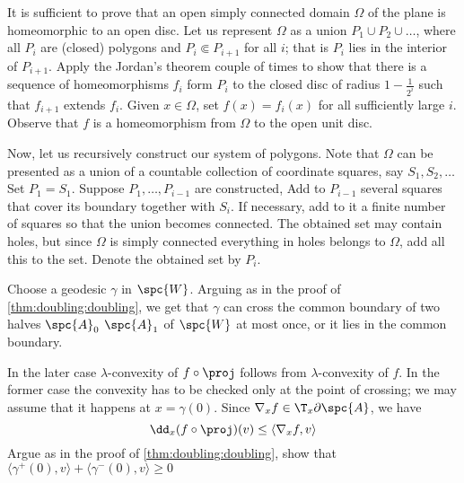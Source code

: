 \medskip

It is sufficient to prove that an open simply connected domain $\Omega$ of the plane is homeomorphic to an open disc.
Let us represent $\Omega$ as a union $P_1\cup P_2\cup\ldots$, where all $P_i$ are (closed) polygons and $P_i\Subset P_{i+1}$ for all $i$; that is $P_i$ lies in the interior of $P_{i+1}$.
Apply the Jordan's theorem couple of times to show that there is a sequence of homeomorphisms $f_i$ form $P_i$ to the closed disc of radius $1-\tfrac1{2^i}$ such that $f_{i+1}$ extends $f_i$.
Given $x\in \Omega$, set $f(x)=f_i(x)$ for all sufficiently large $i$.
Observe that $f$ is a homeomorphism from $\Omega$ to the open unit disc.

Now, let us recursively construct our system of polygons.
Note that $\Omega$ can be presented as a union of a countable collection of coordinate squares, say $S_1,S_2,\dots$
Set $P_1=S_1$.
Suppose $P_1,\dots,P_{i-1}$ are constructed,
Add to $P_{i-1}$ several squares that cover its boundary together with $S_i$.
If necessary, add to it a finite number of squares so that the union becomes connected.
The obtained set may contain holes, but since $\Omega$ is simply connected everything in holes belongs to $\Omega$, add all this to the set.
Denote the obtained set by $P_i$.






















Choose a geodesic $\gamma$ in $\spc{W}$.
Arguing as in the proof of \ref{thm:doubling:doubling}, we get 
that $\gamma$ can cross the common boundary of two halves $\spc{A}_0$ $\spc{A}_1$ of $\spc{W}$ at most once, or it lies in the common boundary.

In the later case $\lambda$-convexity of $f\circ\proj$ follows from $\lambda$-convexity of $f$.
In the former case the convexity has to be checked only at the point of crossing;
we may assume that it happens at $x=\gamma(0)$.
Since $\nabla_x f\in \T_x\partial\spc{A}$, we have 
\[\dd_x(f\circ\proj)(v)\le\langle\nabla_x f,v\rangle\]
Argue as in the proof of \ref{thm:doubling:doubling}, show that 
$\langle\gamma^+(0),v\rangle+\langle\gamma^-(0),v\rangle \ge 0$
















